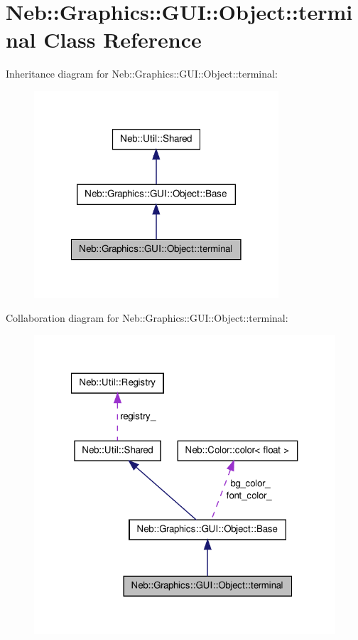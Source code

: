 \hypertarget{classNeb_1_1Graphics_1_1GUI_1_1Object_1_1terminal}{\section{\-Neb\-:\-:\-Graphics\-:\-:\-G\-U\-I\-:\-:\-Object\-:\-:terminal \-Class \-Reference}
\label{classNeb_1_1Graphics_1_1GUI_1_1Object_1_1terminal}
}


\-Inheritance diagram for \-Neb\-:\-:\-Graphics\-:\-:\-G\-U\-I\-:\-:\-Object\-:\-:terminal\-:\nopagebreak
\begin{figure}[H]
\begin{center}
\leavevmode
\includegraphics[width=258pt]{classNeb_1_1Graphics_1_1GUI_1_1Object_1_1terminal__inherit__graph}
\end{center}
\end{figure}


\-Collaboration diagram for \-Neb\-:\-:\-Graphics\-:\-:\-G\-U\-I\-:\-:\-Object\-:\-:terminal\-:\nopagebreak
\begin{figure}[H]
\begin{center}
\leavevmode
\includegraphics[width=321pt]{classNeb_1_1Graphics_1_1GUI_1_1Object_1_1terminal__coll__graph}
\end{center}
\end{figure}

